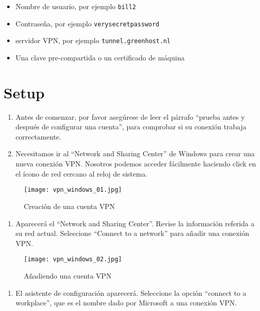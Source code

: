 \documentclass[10pt,a5paper,twoside,,]{book}
\providecommand{\tightlist}{%
  \setlength{\itemsep}{0pt}\setlength{\parskip}{0pt}}
\begin{document}
\begin{itemize}
\tightlist
\item
  Nombre de usuario, por ejemplo \texttt{bill2}
\item
  Contraseña, por ejemplo \texttt{verysecretpassword}
\item
  servidor VPN, por ejemplo \texttt{tunnel.greenhost.nl}
\item
  Una clave pre-compartida o un certificado de máquina
\end{itemize}

\section{Setup}\label{setup}

\begin{enumerate}
\def\labelenumi{\arabic{enumi}.}
\item
  Antes de comenzar, por favor asegúrese de leer el párrafo ``prueba
  antes y después de configurar una cuenta'', para comprobar si su
  conexión trabaja correctamente.
\item
  Necesitamos ir al ``Network and Sharing Center'' de Windows para crear
  una nueva conexión VPN. Nosotros podemos acceder fácilmente haciendo
  click en el ícono de red cercano al reloj de sistema.
\end{enumerate}

\begin{figure}[htbp]
\centering
\texttt{[image: vpn\_windows\_01.jpg]}
\caption{Creación de una cuenta VPN}
\end{figure}

\begin{enumerate}
\def\labelenumi{\arabic{enumi}.}
\setcounter{enumi}{2}
\tightlist
\item
  Aparecerá el ``Network and Sharing Center''. Revise la información
  referida a su red actual. Seleccione ``Connect to a network'' para
  añadir una conexión VPN.
\end{enumerate}

\begin{figure}[htbp]
\centering
\texttt{[image: vpn\_windows\_02.jpg]}
\caption{Añadiendo una cuenta VPN}
\end{figure}

\begin{enumerate}
\def\labelenumi{\arabic{enumi}.}
\setcounter{enumi}{3}
\tightlist
\item
  El asistente de configuración aparecerá. Seleccione la opción
  ``connect to a workplace'', que es el nombre dado por Microsoft a una
  conexión VPN.
\end{enumerate}
\end{document}
